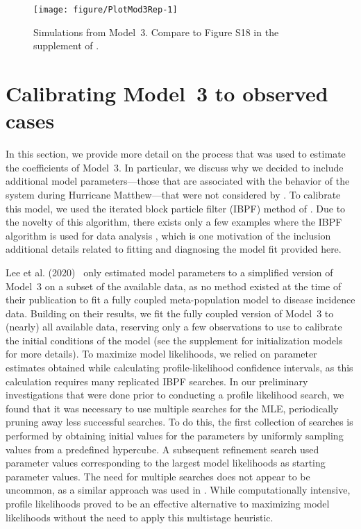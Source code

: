 \begin{figure}[!h]
\begin{knitrout}
\color{fgcolor}
\texttt{[image: figure/PlotMod3Rep-1]} 
\end{knitrout}
\caption[Simulations from replicated Model 3]{\label{fig:mod3rep}
Simulations from Model~3.
Compare to Figure S18 in the supplement of \citet{lee20}.
}
\end{figure}



\section{Calibrating Model~3 to observed cases}\label{sec:appendix_haiti_mod3Cal}












In this section, we provide more detail on the process that was used to estimate the coefficients of Model~3.
In particular, we discuss why we decided to include additional model parameters---those that are associated with the behavior of the system during Hurricane Matthew---that were not considered by \cite{lee20}.
To calibrate this model, we used the iterated block particle filter (IBPF) method of \cite{ionides24}.
Due to the novelty of this algorithm, there exists only a few examples where the IBPF algorithm is used for data analysis \cite{li23,ionides24}, which is one motivation of the inclusion additional details related to fitting and diagnosing the model fit provided here.

Lee et al. (2020)~\cite{lee20} only estimated model parameters to a simplified version of Model~3 on a subset of the available data, as no method existed at the time of their publication to fit a fully coupled meta-population model to disease incidence data.
Building on their results, we fit the fully coupled version of Model~3 to (nearly) all available data, reserving only a few observations to use to calibrate the initial conditions of the model (see the supplement for initialization models for more details).
To maximize model likelihoods, we relied on parameter estimates obtained while calculating profile-likelihood confidence intervals, as this calculation requires many replicated IBPF searches.
In our preliminary investigations that were done prior to conducting a profile likelihood search, we found that it was necessary to use multiple searches for the MLE, periodically pruning away less successful searches.
To do this, the first collection of searches is performed by obtaining initial values for the parameters by uniformly sampling values from a predefined hypercube.
A subsequent refinement search used parameter values corresponding to the largest model likelihoods as starting parameter values.
The need for multiple searches does not appear to be uncommon, as a similar approach was used in \cite{ionides24}.
While computationally intensive, profile likelihoods proved to be an effective alternative to maximizing model likelihoods without the need to apply this multistage heuristic.

